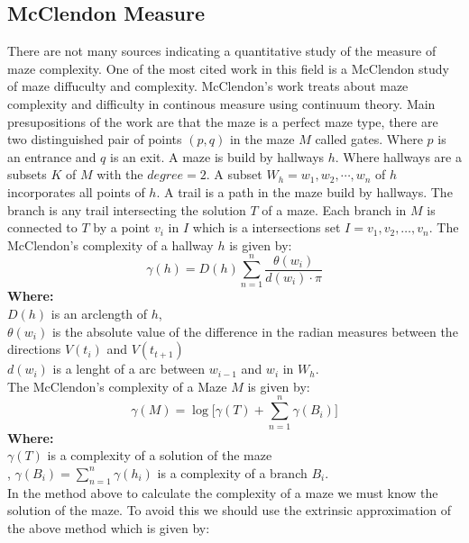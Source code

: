 \subsection{McClendon Measure}
There are not many sources indicating a quantitative study of the measure of maze complexity. One of the most cited work in this field is a McClendon study of maze diffuculty and complexity.
McClendon's work treats about maze complexity and difficulty in continous measure using continuum theory.
Main presupositions of the work are that the maze is a perfect maze type, there are two distinguished pair of points $(p,q)$ in the maze $M$ called gates. Where $p$ is an entrance and $q$ is an exit. A maze is build by hallways $h$. Where hallways are a subsets $K$ of $M$ with the $degree = 2$. A subset $W_h = {w_1,w_2,\cdots, w_n}$ of $h$ incorporates all points of $h$.
A trail is a path in the maze build by hallways. The branch is any trail intersecting the solution $T$ of a maze. Each branch in $M$ is connected to $T$ by a point $v_i$ in $I$ which is a intersections set $I = {v_1,v_2,\dots, v_n}$.
The McClendon's complexity of a hallway $h$ is given by:\\
\begin{equation}
\gamma(h) = D(h)\sum_{n = 1}^{n} \frac{\theta(w_i)}{d(w_i)\cdot \pi}
\end{equation}
\textbf{Where:}\\
 $D(h)$ is an arclength of $h$,\\
 $\theta(w_i)$ is the absolute value of the difference in the radian measures between the directions $V(t_i)$ and $V(t_{t+1})$\\
 $d(w_i)$ is a lenght of a arc between $w_{i-1}$ and $w_i$ in $W_h$.\\
 \newline
The McClendon's complexity of a Maze $M$ is given by:\\
\begin{equation}
\gamma(M)=\log\bigl[\gamma(T) + \sum_{n = 1}^{n} \gamma(B_i)  \bigr] 
\end{equation}
\textbf{Where:}\\
$\gamma(T)$ is a complexity of a solution of the maze\\,
$\gamma(B_i) = \sum_{n = 1}^{n} \gamma(h_i)$ is a complexity of a branch $B_i$.\\
\newline In the method above to calculate the complexity of a maze we must know the solution of the maze. To avoid this we should use the extrinsic approximation of the above method which is given by:\\
